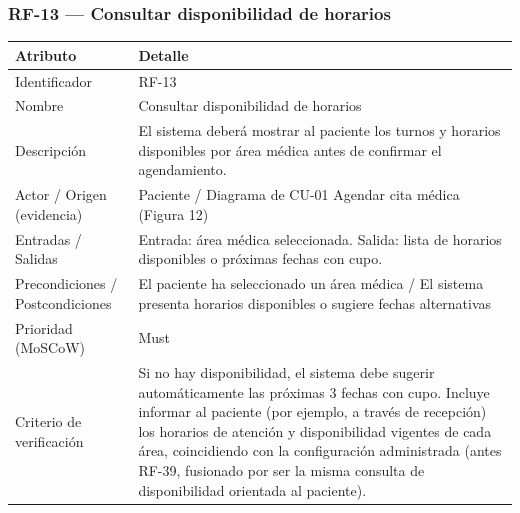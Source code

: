 \documentclass[11pt,a4paper]{article}
\begin{document}
	\subsubsection{RF-13 --- Consultar disponibilidad de horarios}
	
	\begin{longtable}{p{} p{}}
		
		\toprule
		\textbf{Atributo} & \textbf{Detalle} \\
		\midrule
		\endhead
		
		Identificador & RF-13 \\
		Nombre & Consultar disponibilidad de horarios \\
		Descripción & El sistema deberá mostrar al paciente los turnos y horarios disponibles por área médica antes de confirmar el agendamiento. \\
		Actor / Origen (evidencia) & Paciente / Diagrama de CU-01 Agendar cita médica (Figura 12) \\
		Entradas / Salidas & Entrada: área médica seleccionada. Salida: lista de horarios disponibles o próximas fechas con cupo. \\
		Precondiciones / Postcondiciones & El paciente ha seleccionado un área médica / El sistema presenta horarios disponibles o sugiere fechas alternativas \\
		Prioridad (MoSCoW) & Must \\
		Criterio de verificación & Si no hay disponibilidad, el sistema debe sugerir automáticamente las próximas 3 fechas con cupo. Incluye informar al paciente (por ejemplo, a través de recepción) los horarios de atención y disponibilidad vigentes de cada área, coincidiendo con la configuración administrada (antes RF-39, fusionado por ser la misma consulta de disponibilidad orientada al paciente). \\
		\bottomrule
	\end{longtable}
	
\end{document}
